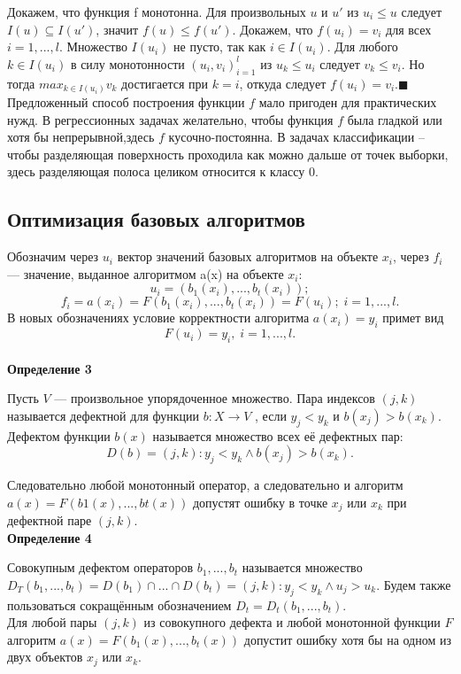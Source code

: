 Докажем, что функция f монотонна. Для произвольных $u$ и $u\prime $ из $u_i \leq u$ следует $I(u)\subseteq I( u\prime)$, значит $f(u)\leq f(u\prime )$.
Докажем, что $f(u_i) = v_i$ для всех $i = 1, . . . , l$. Множество $I(u_i)$ не пусто, так
как $i \in I(u_i)$. Для любого $k \in I(u_i)$ в силу монотонности $(u_i, v_i)^l_{i=1}$ из $u_k \leq u_i$ следует $v_k \leq v_i$. Но тогда $max_{k\in I(u_i)} v_k$ достигается при $k = i$, откуда следует $f(u_i) = v_i$.$\blacksquare$\\




Предложенный способ построения функции $f$ мало пригоден для практических нужд.
 В регрессионных задачах желательно, чтобы функция $f$ была гладкой или хотя бы непрерывной,здесь  $f$ кусочно-постоянна. В задачах классификации  -- чтобы разделяющая поверхность проходила как можно дальше от точек выборки, здесь разделяющая полоса целиком относится к классу 0.


\subsection{Оптимизация базовых алгоритмов}

Обозначим через $u_i$ вектор значений базовых алгоритмов на объекте $x_i$, через $f_i$ — значение, выданное алгоритмом a(x) на объекте $x_i$:
\[u_i = (b_1(x_i), . . . , b_t(x_i));\]
\[f_i = a(x_i) = F(b_1(x_i), . . . , b_t(x_i)) = F(u_i); \; i = 1, . . . , l.\]
В новых обозначениях условие корректности алгоритма $a(x_i) = y_i$ примет вид
\[F(u_i) = y_i
, \; i = 1, . . . , l. 
\]\\

\textbf{Определение 3} 

Пусть $V$ — произвольное упорядоченное множество. Пара индексов $(j, k)$
называется дефектной для функции $b : X \rightarrow V$ , если $y_j < y_k$ и $b(x_j ) > b(x_k)$. Дефектом функции $b(x)$ называется множество всех её дефектных пар:
\[D(b) = {(j, k): y_j < y_k \wedge b(x_j ) > b(x_k)} .\]


Следовательно любой монотонный оператор, а следовательно и алгоритм $a(x) = F(b1(x), . . . , bt(x)) $ допустят ошибку в точке $x_j$ или $x_k$ при дефектной паре $(j, k)$.
\\

\textbf{Определение 4} 

Совокупным дефектом операторов $b_1, . . . , b_t$ называется множество
$D_T (b_1, . . . , b_t) = D(b_1) \cap ... \cap D(b_t) = {(j, k): y_j < y_k \wedge u_j > u_k}.$
Будем также пользоваться сокращённым обозначением $D_t = D_t(b_1, . . . , b_t).$
\\
Для любой пары $(j, k)$ из совокупного дефекта и любой монотонной функции $F$ алгоритм $a(x) = F(b_1(x), . . . , b_t(x)) $ допустит ошибку хотя бы на одном из двух объектов $x_j$ или $x_k$.\\


